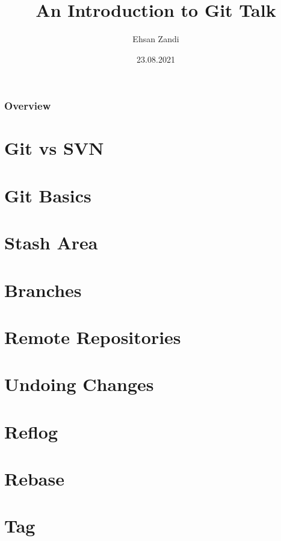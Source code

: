 \documentclass{beamer}
\title[Short title]{An Introduction to Git Talk} %
\author{Ehsan Zandi} %
\institute[DTIT] %
{
Deutsche Telekom IT \\ %
\medskip
ehsan.zandi@telekom.de
}
\date{23.08.2021} %
\begin{document}
\begin{frame}
\titlepage %
\end{frame}

\begin{frame}
\frametitle{Overview} %
\tableofcontents %
\end{frame}


\section{Git vs SVN} 
%
\section{Git Basics}





\section{Stash Area} 
\section{Branches} 
\section{Remote Repositories} 
\section{Undoing Changes} 
\section{Reflog}
\section{Rebase}
\section{Tag}
\end{document}
